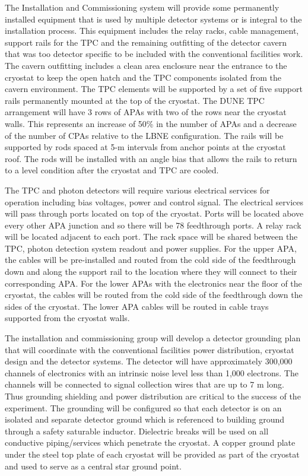 The Installation and Commissioning system will provide some permanently installed equipment that is 
used by multiple detector systems or is integral to the installation process. This equipment includes the 
relay racks, cable management, support rails for the TPC and the remaining outfitting of the detector 
cavern that was too detector specific to be included with the conventional facilities work. The cavern 
outfitting includes a clean area enclosure near the entrance to the cryostat to keep the open hatch and the 
TPC components isolated from the cavern environment. The TPC elements will be supported by a set of 
five support rails permanently mounted at the top of the cryostat. The DUNE TPC arrangement will have 3 
rows of APAs with two of the rows near the cryostat walls. This represents an increase of 50\% in the 
number of APAs and a decrease of the number of CPAs relative to the LBNE configuration. The rails will 
be supported by rods spaced at 5-m intervals from anchor points at the cryostat roof. The rods will be 
installed with an angle bias that allows the rails to return to a level condition after the cryostat and TPC are
cooled. 

The TPC and photon detectors will require various electrical services for operation including bias voltages, 
power and control signal. The electrical services will pass 
through ports located on top of the cryostat. Ports will be located above every other APA junction and so 
there will be 78 feedthrough ports. A relay rack will be located adjacent to each port. The rack space will 
be shared between the TPC, photon detection system readout and power supplies. For the upper APA, 
the cables will be pre-installed and routed from the cold side of the feedthrough down and along the 
support rail to the location where they will connect to their corresponding APA. For the lower APAs with 
the electronics near the floor of the cryostat, the cables will be routed from the cold side of the 
feedthrough down the sides of the cryostat. The lower APA cables will be routed in cable trays supported 
from the cryostat walls.

The installation and commissioning group will develop a detector grounding plan that will coordinate with the 
conventional facilities power distribution, cryostat design and the detector systems.  The 
detector will have approximately 300,000 channels of electronics with an intrinsic noise level less than 
1,000 electrons. The channels will be connected to signal collection wires that are up to 7 m long. Thus grounding 
shielding and power distribution are critical to the success of the experiment. The grounding will be 
configured so that each detector is on an isolated and separate detector ground which is referenced to 
building ground through a safety saturable inductor.  Dielectric breaks will be used on all conductive 
piping/services which penetrate the cryostat.  A copper ground plate under the steel top plate of each 
cryostat will be provided as part of the cryostat and used to serve as a central star ground point. 


